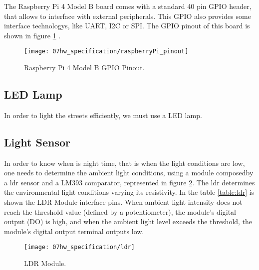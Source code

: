 The Raspberry Pi 4 Model B board comes with a standard 40 pin GPIO header, that allows to interface with external peripherals. This GPIO also provides some interface technologys, like UART, I2C or SPI. The GPIO pinout of this board is shown in figure \ref{fig:rasp_pinout} \cite{pinout}.

\begin{figure}[ht]
	\centering
	\texttt{[image: 07hw\_specification/raspberryPi\_pinout]}
	\caption{Raspberry Pi 4 Model B GPIO Pinout.}
	\label{fig:rasp_pinout}
\end{figure}


\subsection{LED Lamp}

In order to light the streets efficiently, we must use a LED lamp. 

\subsection{Light Sensor}

In order to know when is night time, that is when the light conditions are low, one needs to determine the ambient light conditions, using a module composedby a \ac{ldr} sensor and a LM393 comparator, represented in figure \ref{fig:ldr}. The \ac{ldr} determines the environmental light conditions varying its resistivity. In the table \ref{table:ldr} is shown the LDR Module interface pins. When ambient light intensity does not reach the threshold value (defined by a potentiometer), the module's digital output (DO) is high, and when the ambient light level exceeds the threshold, the module's digital output terminal outputs low.

\begin{figure}[ht]
	\centering
	\texttt{[image: 07hw\_specification/ldr]}
	\caption{LDR Module.}
	\label{fig:ldr}
\end{figure}

\begin{table}[H]
	\centering
	
	\caption{LDR Module Interface Pins.}
	\label{table:ldr}
\end{table}

